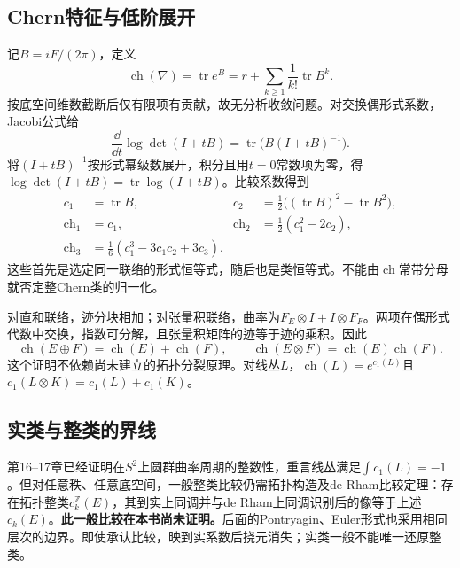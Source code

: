 \subsection{Chern特征与低阶展开}
记$B=iF/(2\pi)$，定义
\begin{equation}\label{eq:chern-character}
 \operatorname{ch}(\nabla)=\operatorname{tr}e^B
 =r+\sum_{k\geq1}\frac1{k!}\operatorname{tr}B^k.
\end{equation}
按底空间维数截断后仅有限项有贡献，故无分析收敛问题。对交换偶形式系数，Jacobi公式给
\[
 \frac{\dd}{\dd t}\log\det(I+tB)
 =\operatorname{tr}\bigl(B(I+tB)^{-1}\bigr).
\]
将$(I+tB)^{-1}$按形式幂级数展开，积分且用$t=0$常数项为零，得$\log\det(I+tB)=\operatorname{tr}\log(I+tB)$。比较系数得到
\begin{align*}
 c_1&=\operatorname{tr}B,&
 c_2&=\tfrac12\bigl((\operatorname{tr}B)^2-\operatorname{tr}B^2\bigr),\\
 \operatorname{ch}_1&=c_1,&
 \operatorname{ch}_2&=\tfrac12(c_1^2-2c_2),\\
 \operatorname{ch}_3&=\tfrac16(c_1^3-3c_1c_2+3c_3).
\end{align*}
这些首先是选定同一联络的形式恒等式，随后也是类恒等式。不能由$\operatorname{ch}$常带分母就否定整Chern类的归一化。

对直和联络，迹分块相加；对张量积联络，曲率为$F_E\otimes I+I\otimes F_F$。两项在偶形式代数中交换，指数可分解，且张量积矩阵的迹等于迹的乘积。因此
\[
 \operatorname{ch}(E\oplus F)=\operatorname{ch}(E)+\operatorname{ch}(F),\qquad
 \operatorname{ch}(E\otimes F)=\operatorname{ch}(E)\operatorname{ch}(F).
\]
这个证明不依赖尚未建立的拓扑分裂原理。对线丛$L$，$\operatorname{ch}(L)=e^{c_1(L)}$且$c_1(L\otimes K)=c_1(L)+c_1(K)$。

\subsection{实类与整类的界线}
第16--17章已经证明在$S^2$上圆群曲率周期的整数性，重言线丛满足$\int c_1(L)=-1$。但对任意秩、任意底空间，一般整类比较仍需拓扑构造及de Rham比较定理：存在拓扑整类$c_k^{\mathbb Z}(E)$，其到实上同调并与de Rham上同调识别后的像等于上述$c_k(E)$。\textbf{此一般比较在本书尚未证明。}后面的Pontryagin、Euler形式也采用相同层次的边界。即使承认比较，映到实系数后挠元消失；实类一般不能唯一还原整类。
